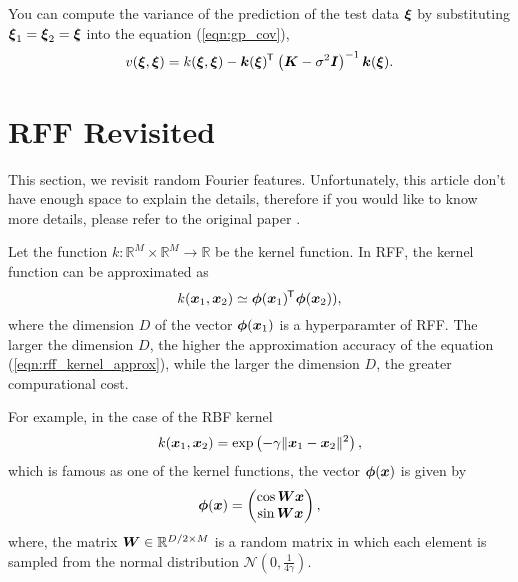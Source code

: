 \documentclass[twocolumn, a4paper, 10pt]{article}
\begin{document}
You can compute the variance of the prediction of the test data $\boldsymbol{\xi}$
by substituting $\boldsymbol{\xi}_1 = \boldsymbol{\xi}_2 = \boldsymbol{\xi}$ into the equation (\ref{eqn:gp_cov}),
\begin{equation}
    v (\boldsymbol{\xi}, \boldsymbol{\xi}) = k (\boldsymbol{\xi}, \boldsymbol{\xi})
    - \boldsymbol{k} (\boldsymbol{\xi})^{\mkern-1.5mu\mathsf{T}}\hspace{0.5pt} \left( \boldsymbol{K} - \sigma^2 \boldsymbol{I} \right)^{-1} \boldsymbol{k} (\boldsymbol{\xi}).
\end{equation}


\section{RFF Revisited}\titlebar

This section, we revisit random Fourier features. Unfortunately, this article don't have
enough space to explain the details, therefore if you would like to know more details,
please refer to the original paper \cite{Rahimi2007}.

Let the function $k: \mathbb{R}^M \times \mathbb{R}^M \to \mathbb{R}$ be the kernel function.
In RFF, the kernel function can be approximated as
\begin{equation}
    k (\boldsymbol{x}_1, \boldsymbol{x}_2) \simeq \boldsymbol{\phi} ({\boldsymbol{x}_1})^{\mkern-1.5mu\mathsf{T}}\hspace{0.5pt} \boldsymbol{\phi} ({\boldsymbol{x}_2) }),
    \label{eqn:rff_kernel_approx}
\end{equation}
where the dimension $D$ of the vector $\boldsymbol{\phi} (\boldsymbol{x}_1)$ is a hyperparamter of RFF.
The larger the dimension $D$, the higher the approximation accuracy of the equation
(\ref{eqn:rff_kernel_approx}), while the larger the dimension $D$, the greater compurational cost.

For example, in the case of the RBF kernel
\begin{equation}
    k (\boldsymbol{x}_1, \boldsymbol{x}_2) = \exp \left (- \gamma \| \boldsymbol{x}_1 - \boldsymbol{x}_2 \|^2 \right),
\end{equation}
which is famous as one of the kernel functions, the vector $\boldsymbol{\phi} (\boldsymbol{x})$ is given by
\begin{equation}
    \boldsymbol{\phi} (\boldsymbol{x}) = \begin{pmatrix}
        \cos \boldsymbol{Wx} \\
        \sin \boldsymbol{Wx}
    \end{pmatrix},
\end{equation}
where, the matrix $\boldsymbol{W} \in \mathbb{R}^{D/2 \times M} $ is a random matrix in which each element
is sampled from the normal distribution $\mathcal{N} (0, \frac{1}{4 \gamma})$.
\end{document}

